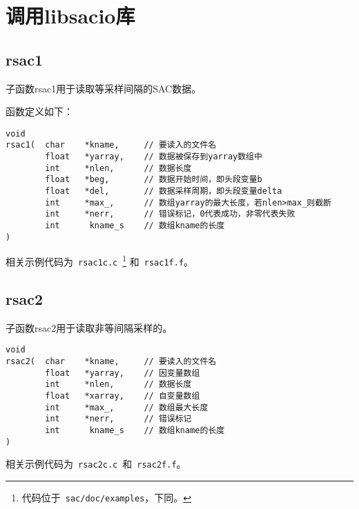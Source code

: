 \section{调用libsacio库}
\subsection{rsac1}
子函数rsac1用于读取等采样间隔的SAC数据。

函数定义如下：
\begin{lstlisting}[style=C]
void                                                                                
rsac1(  char    *kname,     // 要读入的文件名
        float   *yarray,    // 数据被保存到yarray数组中                                               
        int     *nlen,      // 数据长度                             
        float   *beg,       // 数据开始时间，即头段变量b                                             
        float   *del,       // 数据采样周期，即头段变量delta
        int     *max_,      // 数组yarray的最大长度，若nlen>max_则截断                        
        int     *nerr,      // 错误标记，0代表成功，非零代表失败              
        int      kname_s    // 数组kname的长度
)
\end{lstlisting}

相关示例代码为~\lstinline{rsac1c.c}~\footnote{代码位于~\lstinline{sac/doc/examples}，下同。}
和~\lstinline{rsac1f.f}。

\subsection{rsac2}
子函数rsac2用于读取非等间隔采样的。
\begin{lstlisting}[style=C]
void 
rsac2(  char    *kname,     // 要读入的文件名                                                         
        float   *yarray,    // 因变量数组                                       
        int     *nlen,      // 数据长度                                           
        float   *xarray,    // 自变量数组
        int     *max_,      // 数组最大长度                                             
        int     *nerr,      // 错误标记                                         
        int      kname_s    // 数组kname的长度
)
\end{lstlisting}
相关示例代码为~\lstinline{rsac2c.c}~和~\lstinline{rsac2f.f}。

